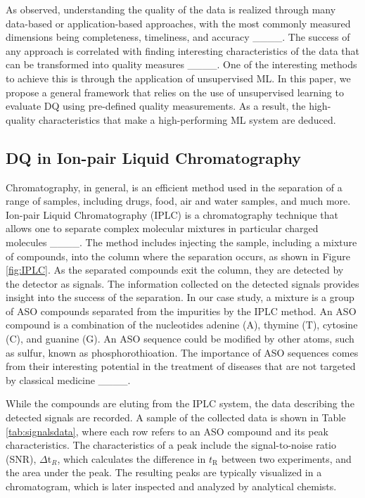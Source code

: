 As observed, understanding the quality of the data is realized through many data-based or application-based approaches, with the most commonly measured dimensions being completeness, timeliness, and accuracy ____. The success of any approach is correlated with finding interesting characteristics of the data that can be transformed into quality measures ____. One of the interesting methods to achieve this is through the application of unsupervised ML. In this paper, we propose a general framework that relies on the use of unsupervised learning to evaluate DQ using pre-defined quality measurements. As a result, the high-quality characteristics that make a high-performing ML system are deduced.

\subsection{DQ in Ion-pair Liquid Chromatography}

Chromatography, in general, is an efficient method used in the separation of a range of samples, including drugs, food, air and water samples, and much more. Ion-pair Liquid Chromatography (IPLC) is a chromatography technique that allows one to separate complex molecular mixtures in particular charged molecules ____. The method includes injecting the sample, including a mixture of compounds, into the column where the separation occurs, as shown in Figure \ref{fig:IPLC}. As the separated compounds exit the column, they are detected by the detector as signals. The information collected on the detected signals provides insight into the success of the separation. In our case study, a mixture is a group of ASO compounds separated from the impurities by the IPLC method. An ASO compound is a combination of the nucleotides adenine (A), thymine (T), cytosine (C), and guanine (G). An ASO sequence could be modified by other atoms, such as sulfur, known as phosphorothioation. The importance of ASO sequences comes from their interesting potential in the treatment of diseases that are not targeted by classical medicine ____. 

While the compounds are eluting from the IPLC system, the data describing the detected signals are recorded. A sample of the collected data is shown in Table \ref{tab:signalsdata}, where each row refers to an ASO compound and its peak characteristics. The characteristics of a peak include the signal-to-noise ratio (SNR), $\Delta$t$_R$, which calculates the difference in $t_\mathrm{R}$ between two experiments, and the area under the peak. The resulting peaks are typically visualized in a chromatogram, which is later inspected and analyzed by analytical chemists.

